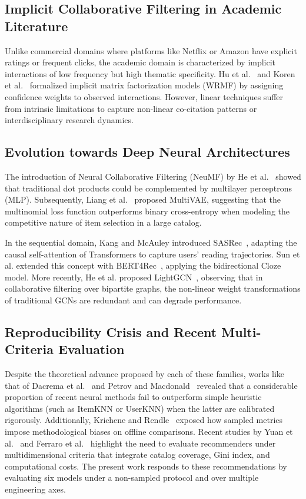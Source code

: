 \documentclass[journal]{IEEEtran}
\begin{document}
\subsection{Implicit Collaborative Filtering in Academic Literature}
Unlike commercial domains where platforms like Netflix or Amazon have explicit ratings or frequent clicks, the academic domain is characterized by implicit interactions of low frequency but high thematic specificity. Hu et al.~\cite{hu2008collaborative} and Koren et al.~\cite{koren2009matrix} formalized implicit matrix factorization models (WRMF) by assigning confidence weights to observed interactions. However, linear techniques suffer from intrinsic limitations to capture non-linear co-citation patterns or interdisciplinary research dynamics.

\subsection{Evolution towards Deep Neural Architectures}
The introduction of Neural Collaborative Filtering (NeuMF) by He et al.~\cite{he2017neural} showed that traditional dot products could be complemented by multilayer perceptrons (MLP). Subsequently, Liang et al.~\cite{liang2018variational} proposed MultiVAE, suggesting that the multinomial loss function outperforms binary cross-entropy when modeling the competitive nature of item selection in a large catalog.

In the sequential domain, Kang and McAuley introduced SASRec~\cite{kang2018self}, adapting the causal self-attention of Transformers to capture users' reading trajectories. Sun et al. extended this concept with BERT4Rec~\cite{sun2019bert4rec}, applying the bidirectional Cloze model. More recently, He et al. proposed LightGCN~\cite{he2020lightgcn}, observing that in collaborative filtering over bipartite graphs, the non-linear weight transformations of traditional GCNs are redundant and can degrade performance.

\subsection{Reproducibility Crisis and Recent Multi-Criteria Evaluation}
Despite the theoretical advance proposed by each of these families, works like that of Dacrema et al.~\cite{dacrema2019really} and Petrov and Macdonald~\cite{petrov2023effective} revealed that a considerable proportion of recent neural methods fail to outperform simple heuristic algorithms (such as ItemKNN or UserKNN) when the latter are calibrated rigorously. Additionally, Krichene and Rendle~\cite{krichene2020sampled} exposed how sampled metrics impose methodological biases on offline comparisons. Recent studies by Yuan et al.~\cite{yuan2023benchmarking} and Ferraro et al.~\cite{ferraro2024fairness} highlight the need to evaluate recommenders under multidimensional criteria that integrate catalog coverage, Gini index, and computational costs. The present work responds to these recommendations by evaluating six models under a non-sampled protocol and over multiple engineering axes.
\end{document}
